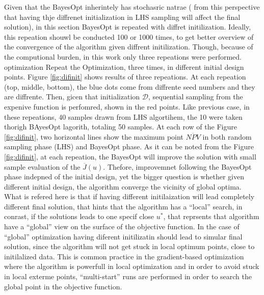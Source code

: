 \documentclass[]{elsarticle} %
\begin{document}
Given that the BayesOpt inherintely has stochasric natrae ( from this perspective that having thje diffrenet initialization in LHS sampling will affect the final solution), in this section BayesOpt is repeated with diffret initilization. Ideally, this repeation shouwl be conducted 100 or 1000 times, to get better overview of the convergence of the algorithm given diffrent initilization. Though, because of the computional burden, in this work only three repeations were performed. optimization Repeat the Optimization, three times, in different initial design points. Figure \ref{fig:difinit} shows results of three repeations. At each repeation (top, middle, bottom), the blue dots come from diffrente seed numbers and they are diffrente. Then, gicen that initialization \(\mathcal{D}\), sequential sampling from the expenive function is perfomred, shown in the red points. Like previous case, in these repeations, 40 samples drawn from LHS algortihem, the 10 were taken thorigh BAyesOpt lagorith, totaling 50 samples. At each row of the Figure \ref{fig:difinit}, two horizontal lines show the maximum point \(\overline{NPV}\) in both random sampling phase (LHS) and BayesOpt phase. As it can be noted from the Figure \ref{fig:difinit}, at each repeation, the BayesOpt will improve the solution with small sample evaluation of the \(\overline{J}(u)\). Thefore, improvemnet following the BayesOpt phase indepned of the initial design, yet the bigger question is whether given different initial design, the algorithm converge the vicinity of global optima. What is refered here is that if having different initilaization will lead completely different final solution, that hints that the algorithm has a ``local'' search, in conrast, if the solutions leads to one specif close \(u^*\), that reprsents that algorithm have a ``global'' view on the surface of the objective function. In the case of ``global'' optimization having diferent initilizatin should lead to simular final solution, since the algorithm will not get stuck in local optimum points, close to initilalized data. This is common practice in the gradient-based optimization where the algorithm is powerfull in local optimization and in order to avoid stuck in local exterme points, ``multi-start'' runs are performed in order to search the global point in the objective function.
\end{document}
